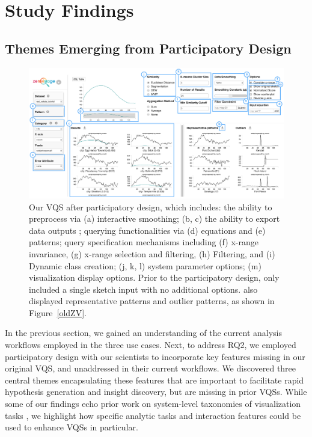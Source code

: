 \section{Study Findings}
\subsection{Themes Emerging from Participatory Design\label{pd_findings}}
\begin{figure}[ht!]
\centering
\vspace{-15pt}
\includegraphics[width=\linewidth]{figures/newZV.pdf} %
\vspace{-5pt}\caption{Our VQS after participatory design, which includes: the ability to preprocess via (a) interactive smoothing; (b, c) the ability to export data outputs ; querying functionalities via (d) equations and (e) patterns; query specification mechanisms including (f) x-range invariance, (g) x-range selection and filtering, (h) Filtering, and (i) Dynamic class creation; (j, k, l) system parameter options; (m) visualization display options. Prior to the participatory design, \zv only included a single sketch input with no additional options. \zv also displayed representative patterns and outlier patterns, as shown in Figure~\ref{oldZV}.}
\label{zvOverview}
\vspace{-14pt}
\end{figure}

\par In the previous section, we gained an understanding of the current analysis workflows employed in the three use cases. Next, to address RQ2, we employed participatory design with our scientists to incorporate key features  missing in our original VQS, and unaddressed in their
current workflows. We discovered three central themes encapsulating these features that are important to facilitate rapid hypothesis generation and insight discovery, but are missing in prior VQSs. While some of our findings echo prior work on system-level taxonomies of visualization tasks \cite{Amar2005,Heer2012}, we highlight how specific analytic tasks and interaction features could be used to enhance VQSs in particular. 
